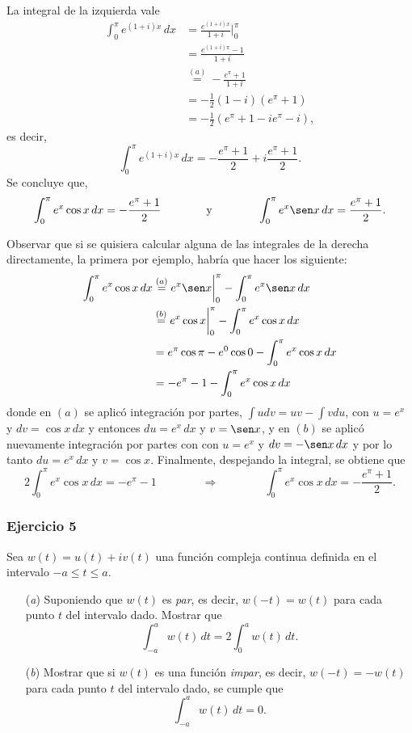 \documentclass[a4paper]{report}
\begin{document}
La integral de la izquierda vale
\begin{align*}
 \int_0^\pi e^{(1+i)x}\,dx&=\frac{e^{(1+i)x}}{1+i}\bigg|_0^\pi\\
  &=\frac{e^{(1+i)\pi}-1}{1+i}\\
  &\overset{(a)}{=}-\frac{e^\pi+1}{1+i}\\
  &=-\frac{1}{2}(1-i)(e^\pi+1)\\
  &=-\frac{1}{2}(e^\pi+1-ie^\pi-i),
\end{align*}
es decir,
\[
 \int_0^\pi e^{(1+i)x}\,dx=-\frac{e^\pi+1}{2}+i\frac{e^\pi+1}{2}.
\]
Se concluye que,
\[
 \int_0^\pi e^x\cos x\,dx=-\frac{e^\pi+1}{2}
 \qquad\qquad\textrm{y}\qquad\qquad
 \int_0^\pi e^x\sen x\,dx=\frac{e^\pi+1}{2}.
\]

Observar que si se quisiera calcular alguna de las integrales de la derecha directamente, la primera por ejemplo, habría que hacer los siguiente:
\begin{align*}
 \int_0^\pi e^x\cos x\,dx&\overset{(a)}{=}e^x\sen x\bigg|_0^\pi-\int_0^\pi e^x\sen x\,dx\\
  &\overset{(b)}{=}e^x\cos x\bigg|_0^\pi-\int_0^\pi e^x\cos x\,dx\\
  &=e^\pi\cos\pi-e^0\cos0-\int_0^\pi e^x\cos x\,dx\\
  &=-e^\pi-1-\int_0^\pi e^x\cos x\,dx
\end{align*}
donde en \((a)\) se aplicó integración por partes, \(\int udv=uv-\int vdu\), con \(u=e^x\) y \(dv=\cos x\,dx\) y entonces \(du=e^x\,dx\) y \(v=\sen x\), y en \((b)\) se aplicó nuevamente integración por partes con con \(u=e^x\) y \(dv=-\sen x\,dx\) y por lo tanto \(du=e^x\,dx\) y \(v=\cos x\). Finalmente, despejando la integral, se obtiene que 
\[
 2\int_0^\pi e^x\cos x\,dx=-e^\pi-1
 \qquad\qquad\Rightarrow\qquad\qquad
 \int_0^\pi e^x\cos x\,dx=-\frac{e^\pi+1}{2}.
\]

\subsubsection{Ejercicio 5} 
 
Sea \(w(t)=u(t)+iv(t)\) una función compleja continua definida en el intervalo \(-a\leq t\leq a\).
\begin{enumerate}
 \item[(\textit{a})] Suponiendo que \(w(t)\) es \emph{par}, es decir, \(w(-t)=w(t)\) para cada punto \(t\) del intervalo dado. Mostrar que 
 \[
  \int_{-a}^a w(t)\,dt=2\int_0^a w(t)\,dt.
 \]
 \item[(\textit{b})] Mostrar que si \(w(t)\) es una función \emph{impar}, es decir, \(w(-t)=-w(t)\) para cada punto \(t\) del intervalo dado, se cumple que
 \[
  \int_{-a}^a w(t)\,dt=0.
 \]
\end{enumerate} 
 
\end{document}
